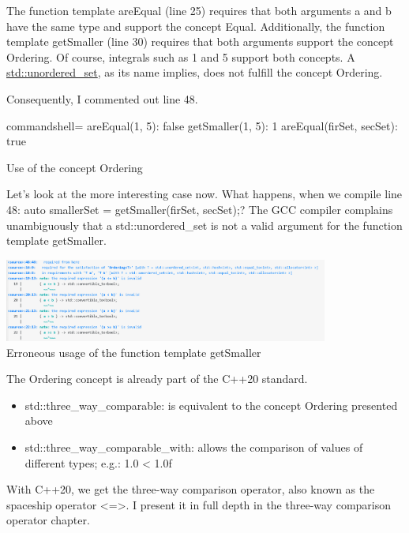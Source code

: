 The function template areEqual (line 25) requires that both arguments a and b have the same type and support the concept Equal. Additionally, the function template getSmaller (line 30) requires that both arguments support the concept Ordering. Of course, integrals such as 1 and 5 support both concepts. A \href{https://en.cppreference.com/w/cpp/container/unordered_set}{std::unordered\_set}, as its name implies, does not fulfill the concept Ordering.

Consequently, I commented out line 48.

\begin{tcblisting}{commandshell={}}
areEqual(1, 5): false
getSmaller(1, 5): 1
areEqual(firSet, secSet): true
\end{tcblisting}

\begin{center}
Use of the concept Ordering
\end{center}

Let’s look at the more interesting case now. What happens, when we compile line 48: auto smallerSet = getSmaller(firSet, secSet);? The GCC compiler complains unambiguously that a std::unordered\_set is not a valid argument for the function template getSmaller.

\begin{center}
\includegraphics[width=0.8\textwidth]{content/3/chapter4/images/1-5.png}\\
Erroneous usage of the function template getSmaller
\end{center}

The Ordering concept is already part of the C++20 standard.

\begin{itemize}
\item 
std::three\_way\_comparable: is equivalent to the concept Ordering presented above

\item 
std::three\_way\_comparable\_with: allows the comparison of values of different types; e.g.: 1.0 < 1.0f
\end{itemize}

With C++20, we get the three-way comparison operator, also known as the spaceship operator <=>. I present it in full depth in the three-way comparison operator chapter.

